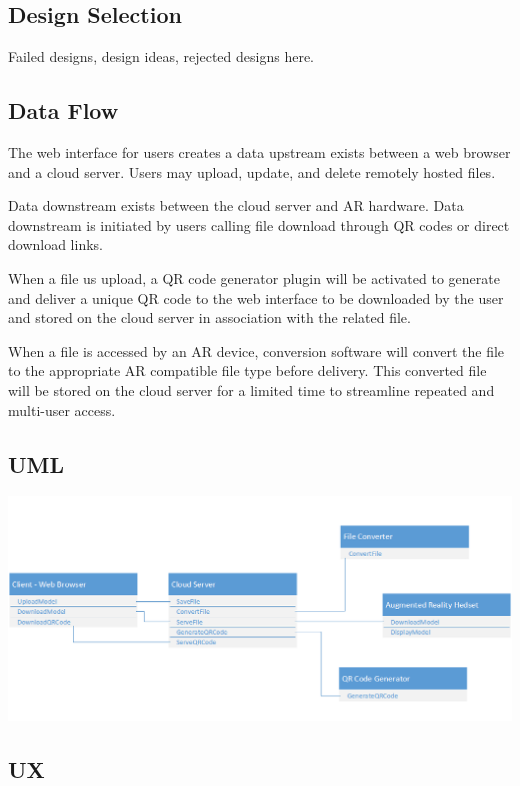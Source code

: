  
 
   \subsection{Design Selection}
 Failed designs, design ideas, rejected designs here.
 
 \subsection{Data Flow}
The web interface for users creates a data upstream exists between a web browser and a cloud server. Users may upload, update, and delete remotely hosted files.

Data downstream exists between the cloud server and AR hardware. Data downstream is initiated by users calling file download through QR codes or direct download links. 

When a file us upload, a QR code generator plugin will be activated to generate and deliver a unique QR code to the web interface to be downloaded by the user and stored on the cloud server in association with the related file. 

When a file is accessed by an AR device, conversion software will convert the file to the appropriate AR compatible file type before delivery. This converted file will be stored on the cloud server for a limited time to streamline repeated and multi-user access.
  
 \subsection{UML}
 
    \includegraphics[width=\textwidth]{UML.png}

 \subsection{UX}

